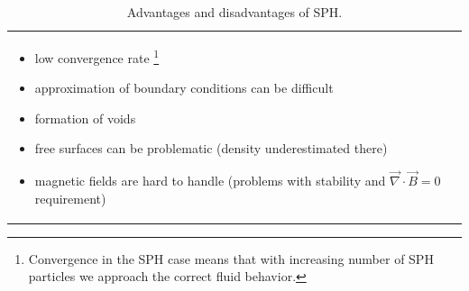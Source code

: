 \begin{table}[!htb]
\begin{tabular}{p{}|p{}}
\begin{itemize}
            \item low convergence rate \footnote{Convergence in the SPH case means that with increasing number of SPH particles we approach the correct fluid behavior.}
            \item approximation of boundary conditions can be difficult
            \item formation of voids
            \item free surfaces can be problematic (density underestimated there)
            \item magnetic fields are hard to handle (problems with stability and $\vec{\nabla} \cdot \vec{B} = 0$ requirement)
        \end{itemize} \\
    \end{tabular}
    \caption{Advantages and disadvantages of SPH.}
    \label{tab:advantages_disadvantages_sph}
\end{table}

\pagebreak